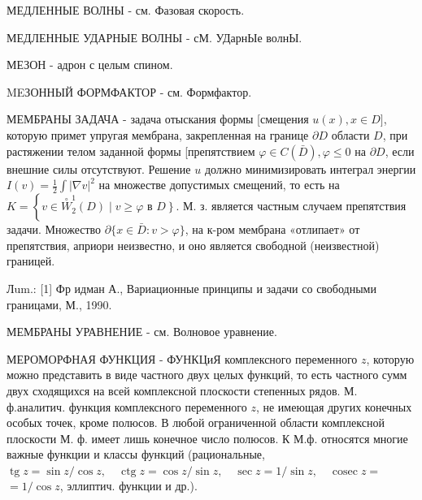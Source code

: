 \documentclass[10pt]{article}
\begin{document}
МЕДЛЕННЫЕ ВОЛНЫ - см. Фазовая скорость.



МЕДЛЕННЫЕ УДАРНЫЕ ВОЛНЫ - сМ. УДарнЫе волнЫ.



МЕЗОН - адрон с целым спином.



MEЗОННЫЙ ФОРМФАКТОР - см. Формфактор.



МЕМБРАНЫ ЗАДАЧА - задача отыскания формы [смещения $u(x), x \in D]$, которую примет упругая мембрана, закрепленная на границе $\partial D$ области $D$, при растяжении телом заданной формы [препятствием $\varphi \in C(\bar{D}), \varphi \leqslant 0$ на $\partial D$, если внешние силы отсутствуют. Решение $u$ должно минимизировать интеграл энергии $I(v)=\frac{1}{2} \int|\nabla v|^{2}$ на множестве допустимых смещений, то есть на $K=\left\{v \in \stackrel{\circ}{W}_{2}^{1}(D) \mid v \geqslant \varphi\right.$ в $\left.D\right\}$. М. з. является частным случаем препятствия задачи. Множество $\partial\{x \in \bar{D}: v>\varphi\}$, на к-ром мембрана «отлипает» от препятствия, априори неизвестно, и оно является свободной (неизвестной) границей.



Лum.: [1] Фр идман А., Вариационные принципы и задачи со свободными границами, М., 1990.



МЕМБРАНЫ УРАВНЕНИЕ - см. Волновое уравнение.



МЕРОМОРФНАЯ ФУНКЦИЯ - ФУНКЦиЯ комплексного переменного $z$, которую можно представить в виде частного двух целых функций, то есть частного сумм двух сходящихся на всей комплексной плоскости степенных рядов. М. ф.аналитич. функция комплексного переменного $z$, не имеющая других конечных особых точек, кроме полюсов. В любой ограниченной области комплексной плоскости М. ф. имеет лишь конечное число полюсов. К М.ф. относятся многие важные функции и классы функций (рациональные, $\operatorname{tg} z=\sin z / \cos z, \quad \operatorname{ctg} z=\cos z / \sin z, \quad \sec z=1 / \sin z, \quad \operatorname{cosec} z=$ $=1 / \cos z$, эллиптич. функции и др.).
\end{document}
